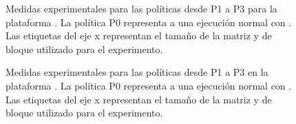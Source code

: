 \begin{figure}
  \centering
  
  \caption[Medidas experimentales para las políticas desde P1 a P3 en \juno]{Medidas
    experimentales para las políticas desde P1 a P3 para la plataforma \juno. La política P0
    representa a una ejecución normal con \botlev. Las etiquetas del eje x
    representan el tamaño de la matriz y de bloque utilizado para el experimento.}
  \label{fig:resultados:all-0-3:juno}
\end{figure}

\begin{figure}
  \centering
  \caption[Medidas experimentales para las políticas desde P1 a P3 en \odroid]{Medidas
    experimentales para las políticas desde P1 a P3 en la plataforma \odroid. La política P0
    representa a una ejecución normal con \botlev. Las etiquetas del eje x
    representan el tamaño de la matriz y de bloque utilizado para el experimento.}
  \label{fig:resultados:all-0-3:odroid}
\end{figure}

